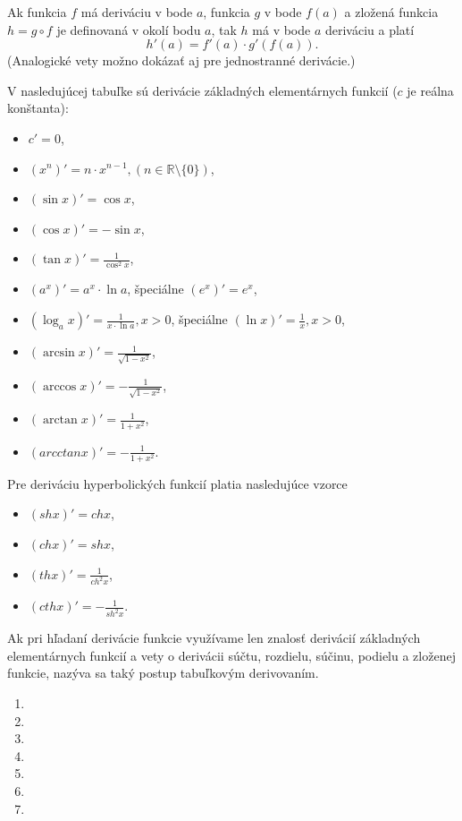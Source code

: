 \begin{veta}
Ak funkcia $f$ má deriváciu v bode $a$, funkcia $g$ v bode $f(a)$ a zložená funkcia $h=g \circ f$ je definovaná v okolí bodu $a$, tak $h$ má v bode $a$ deriváciu a platí $$h'(a)=f'(a)\cdot g'(f(a)).$$
(Analogické vety možno dokázať aj pre jednostranné derivácie.)
\end{veta}

V nasledujúcej tabuľke sú derivácie základných elementárnych funkcií ($c$ je reálna konštanta):
\begin{itemize}
\item $c'=0$,
\item $(x^n)'=n\cdot x^{n-1},(n \in \mathbb{R} \setminus \{0\})$,
\item $(\sin x)'=\cos x$,
\item $(\cos x)'=-\sin x$,
\item $(\tan x)'=\frac{1}{\cos^2 x}$,
\item $(a^x)'=a^x \cdot \ln a$, špeciálne $(e^x)'=e^x$,
\item $(\log_{a} x)'=\frac{1}{x\cdot \ln a},x>0$, špeciálne $(\ln x)'=\frac{1}{x},x>0$,
\item $(\arcsin x)'=\frac{1}{\sqrt{1-x^2}}$,
\item $(\arccos x)'=-\frac{1}{\sqrt{1-x^2}}$,
\item $(\arctan x)'=\frac{1}{1+x^2}$,
\item $(arcctan x)'=-\frac{1}{1+x^2}$.
\end{itemize} 

Pre deriváciu hyperbolických funkcií platia nasledujúce vzorce
\begin{multicols}{2}
\begin{itemize}
   \item $(sh x)'=ch x$,
   \item $(ch x)'=sh x$,
   \item $(th x)'=\frac{1}{ch^2 x}$,
   \item $(cth x)'=-\frac{1}{sh^2 x}$.
\end{itemize}
\end{multicols}

Ak pri hľadaní derivácie funkcie využívame len znalosť derivácií základných elementárnych funkcií a vety o derivácii súčtu, rozdielu, súčinu, podielu a zloženej funkcie, nazýva sa taký postup tabuľkovým derivovaním.

\begin{enumerate}[resume]
	\item {}
	\item {}
	\item {}
	\item {}
	\item {}
	\item {}
	\item {}
\end{enumerate}

